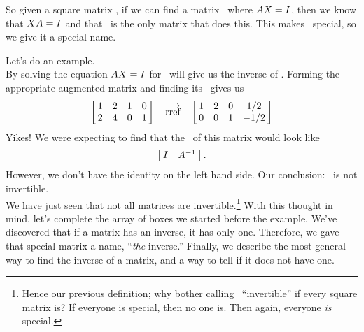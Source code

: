 So given a square matrix \tta, if we can find a matrix \ttx\ where $\tta\ttx=\tti$, then we know that $\ttx\tta = \tti$ and that \ttx\ is the only matrix that does this. This makes \ttx\ special, so we give it a special name.



Let's do an example.\\

{By solving the equation $\tta\ttx = \tti$ for \ttx\ will give us the inverse of \tta. Forming the appropriate augmented matrix and finding its \rref\ gives us $$\bmx{cccc}1&2&1&0\\2&4&0&1\emx \quad \arref \quad \bmx{cccc}1&2&0&1/2\\0&0&1&-1/2\emx$$
Yikes! We were expecting to find that the \rref\ of this matrix would look like $$\bmx{cc}\tti & \ttai\emx.$$ However, we don't have the identity on the left hand side. Our conclusion: \tta\ is not invertible.}\\ %

We have just seen that not all matrices are invertible.\footnote{\label{footnote:special}Hence our previous definition; why bother calling \tta\ ``invertible'' if every square matrix is? If everyone is special, then no one is. Then again, everyone \textit{is} special.} With this thought in mind, let's complete the array of boxes we started before the example. We've discovered that if a matrix has an inverse, it has only one. Therefore, we gave that special matrix a name, ``\textit{the} inverse.'' Finally, we describe the most general way to find the inverse of a matrix, and a way to tell if it does not have one.


